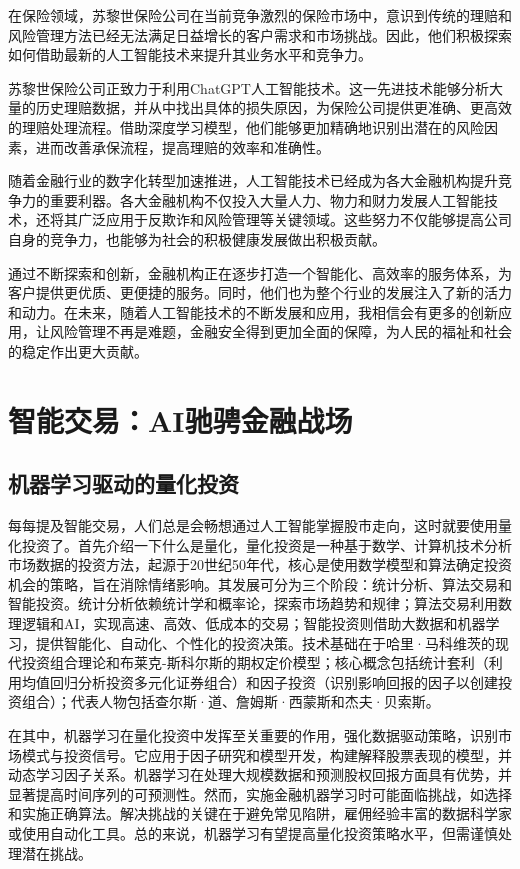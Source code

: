 在保险领域，苏黎世保险公司在当前竞争激烈的保险市场中，意识到传统的理赔和风险管理方法已经无法满足日益增长的客户需求和市场挑战。因此，他们积极探索如何借助最新的人工智能技术来提升其业务水平和竞争力。

苏黎世保险公司正致力于利用ChatGPT人工智能技术。这一先进技术能够分析大量的历史理赔数据，并从中找出具体的损失原因，为保险公司提供更准确、更高效的理赔处理流程。借助深度学习模型，他们能够更加精确地识别出潜在的风险因素，进而改善承保流程，提高理赔的效率和准确性。

随着金融行业的数字化转型加速推进，人工智能技术已经成为各大金融机构提升竞争力的重要利器。各大金融机构不仅投入大量人力、物力和财力发展人工智能技术，还将其广泛应用于反欺诈和风险管理等关键领域。这些努力不仅能够提高公司自身的竞争力，也能够为社会的积极健康发展做出积极贡献。

通过不断探索和创新，金融机构正在逐步打造一个智能化、高效率的服务体系，为客户提供更优质、更便捷的服务。同时，他们也为整个行业的发展注入了新的活力和动力。在未来，随着人工智能技术的不断发展和应用，我相信会有更多的创新应用，让风险管理不再是难题，金融安全得到更加全面的保障，为人民的福祉和社会的稳定作出更大贡献。

\section{智能交易：AI驰骋金融战场}
\subsection{机器学习驱动的量化投资}
每每提及智能交易，人们总是会畅想通过人工智能掌握股市走向，这时就要使用量化投资了。首先介绍一下什么是量化，量化投资是一种基于数学、计算机技术分析市场数据的投资方法，起源于20世纪50年代，核心是使用数学模型和算法确定投资机会的策略，旨在消除情绪影响。其发展可分为三个阶段：统计分析、算法交易和智能投资。统计分析依赖统计学和概率论，探索市场趋势和规律；算法交易利用数理逻辑和AI，实现高速、高效、低成本的交易；智能投资则借助大数据和机器学习，提供智能化、自动化、个性化的投资决策。技术基础在于哈里·马科维茨的现代投资组合理论和布莱克-斯科尔斯的期权定价模型；核心概念包括统计套利（利用均值回归分析投资多元化证券组合）和因子投资（识别影响回报的因子以创建投资组合）；代表人物包括查尔斯·道、詹姆斯·西蒙斯和杰夫·贝索斯。

在其中，机器学习在量化投资中发挥至关重要的作用，强化数据驱动策略，识别市场模式与投资信号。它应用于因子研究和模型开发，构建解释股票表现的模型，并动态学习因子关系。机器学习在处理大规模数据和预测股权回报方面具有优势，并显著提高时间序列的可预测性。然而，实施金融机器学习时可能面临挑战，如选择和实施正确算法。解决挑战的关键在于避免常见陷阱，雇佣经验丰富的数据科学家或使用自动化工具。总的来说，机器学习有望提高量化投资策略水平，但需谨慎处理潜在挑战。

